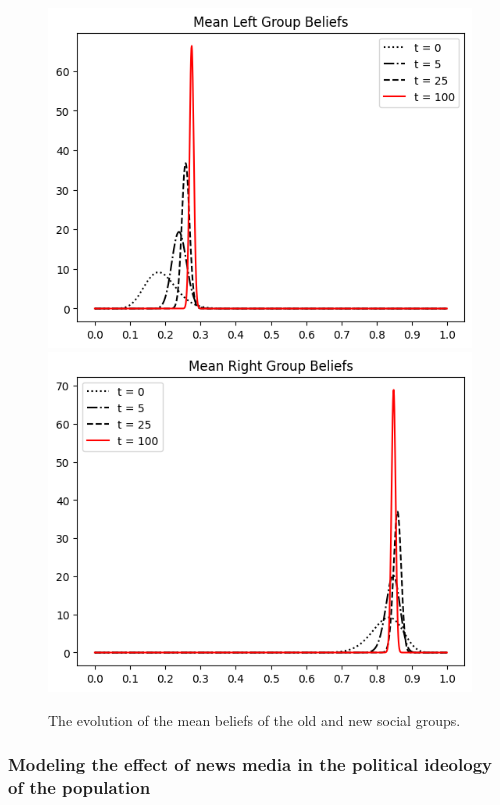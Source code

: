 \documentclass[11pt]{article}
\begin{document}
\begin{figure}[h]
    \centering
    \includegraphics[scale=0.4]{images/two_social_groups_diff_freq_left_mean.png}
    \hspace{1cm}
    \includegraphics[scale=0.4]{images/two_social_groups_diff_freq_right_mean.png}
    \caption{The evolution of the mean beliefs of the old and new social groups.}
\end{figure}

\subsubsection{Modeling the effect of news media in the political ideology of the population}
\end{document}
